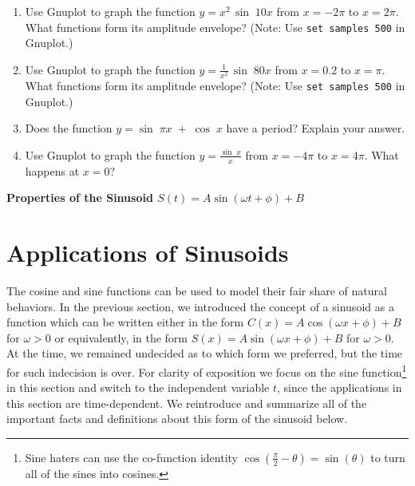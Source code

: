 {\begin{enumerate}[\bfseries 1.]
  You can think of this function as $\sin\;12x$ with a sinusoidally varying ``amplitude''of
  $0.5\,\sin\;x$. What is the period of this function?
  From the graph it looks like the amplitude may be $0.5$.
  Without finding the exact amplitude, explain why the amplitude is in fact \emph{less} than $0.5$.
  The function above is known as a \emph{modulated wave}, and the functions
  $\pm\,0.5\,\sin\;x$ form an \emph{amplitude envelope} for the wave (i.e.
  they enclose the wave). Use an identity from Section 3.4 to write this function as a sum of
  sinusoidal curves.
 \item Use Gnuplot to graph the function $y= x^2 \,\sin\;10x$ from $x = -2\pi$ to $x=2\pi$. What
  functions form its amplitude envelope? (Note: Use \texttt{set samples 500} in Gnuplot.)
 \item Use Gnuplot to graph the function $y= \frac{1}{x^2} \,\sin\;80x$ from $x = 0.2$ to $x=\pi$.
  What functions form its amplitude envelope? (Note: Use \texttt{set samples 500} in Gnuplot.)
 \item Does the function $y=\sin\;\pi x \;+\; \cos\;x$ have a period? Explain your answer.
 \item Use Gnuplot to graph the function $y=\frac{\sin\;x}{x}$ from $x=-4\pi$ to $x=4\pi$. What
  happens at $x=0$?
\end{enumerate}}



\centerline{\textbf{Properties of the Sinusoid \boldmath  $S(t) = A \sin(\omega t + \phi) + B$}} 





\newpage
\section{Applications of Sinusoids}

\label{Sinusoid}

 The cosine and sine functions can be used to model their fair share of natural behaviors. In the previous section, we introduced the concept of a sinusoid as a function which can be written either in the form $C(x) = A \cos(\omega x + \phi) + B$ for $\omega > 0$ or equivalently, in the form $S(x) = A \sin(\omega x + \phi) + B$ for $\omega > 0$.  At the time, we remained undecided as to which form we preferred, but the time for such indecision is over.  For clarity of exposition we focus on the sine function\footnote{Sine haters can use the co-function identity $\cos\left(\frac{\pi}{2} - \theta\right) = \sin(\theta)$ to turn all of the sines into cosines.} in this section and switch to the independent variable $t$, since the applications in this section are time-dependent.  We reintroduce and summarize all of the important facts and definitions about this form of the sinusoid below.

